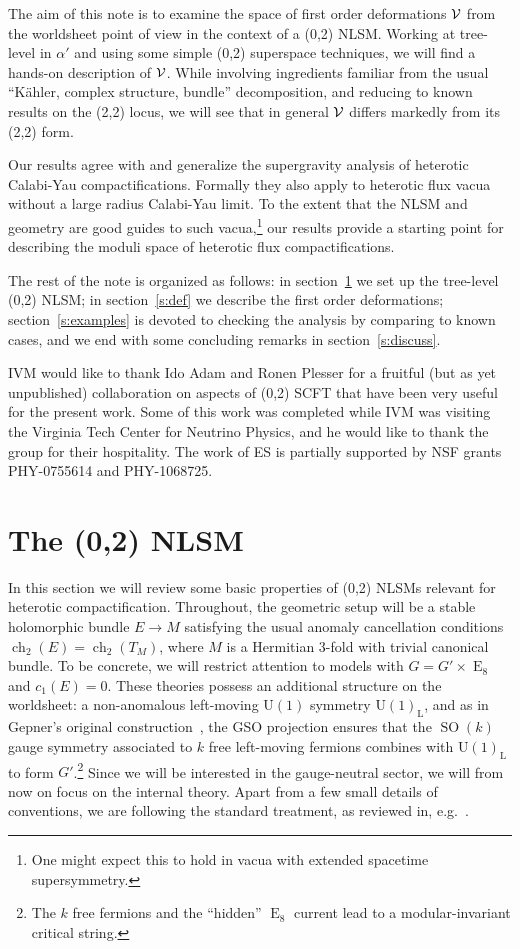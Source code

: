 \documentclass[11pt, a4paper]{article}
\def\GUL{\GU(1)_{\text{L}}}
\def\ch{\operatorname{ch}}
\def\SO{\operatorname{SO}}
\def\GU{\operatorname{U{}}}
\def\GE{\operatorname{E}}
\def\cV{{\cal V}}
\begin{document}
The aim of this note is to examine the space of first order deformations $\cV$ from the worldsheet point of view in the context of a (0,2) NLSM.  Working at tree-level in $\alpha'$ and using some simple (0,2) superspace techniques,  we will find a hands-on description of $\cV$.  While involving
ingredients familiar from the usual ``K\"ahler, complex structure, bundle'' decomposition,
and reducing to known results on the (2,2) locus, we will see that in general $\cV$ differs markedly from its (2,2) form. 

Our results agree with and generalize the supergravity analysis of heterotic Calabi-Yau compactifications.
Formally they also apply to heterotic flux vacua without a large radius Calabi-Yau limit.  To the extent that
the NLSM and geometry are good guides to such vacua,\footnote{One might expect this to hold in
vacua with extended spacetime supersymmetry.} our results provide a starting point for describing the moduli
space of heterotic flux compactifications. 

The rest of the note is organized as follows:  in section~\ref{s:nlsm} we set up the
tree-level (0,2) NLSM; in section~\ref{s:def} we describe the first order deformations;
section~\ref{s:examples} is devoted to checking the analysis by comparing to known cases,
and we end with some concluding remarks in section~\ref{s:discuss}.

\acknowledgments 
IVM would like to thank Ido Adam and Ronen Plesser for a fruitful (but as yet unpublished) 
collaboration on aspects of (0,2) SCFT that have been very useful for the present work.
Some of this work was completed while IVM was visiting the Virginia Tech Center for Neutrino
Physics, and he would like to thank the group for their hospitality.  The work of ES is partially
supported by NSF grants PHY-0755614 and PHY-1068725.



\section{The (0,2) NLSM} \label{s:nlsm}
In this section we will review some basic properties of (0,2) NLSMs relevant for
heterotic compactification.  Throughout, the geometric setup will be a stable 
holomorphic bundle $E \to M$ satisfying the usual anomaly cancellation conditions
$\ch_2(E) = \ch_2(T_M)$, where $M$ is a Hermitian $3$-fold with trivial canonical bundle.
To be concrete, we will restrict attention to models with $G = G' \times\GE_8$ and
$c_1(E) = 0$.  These theories possess an additional structure on the worldsheet:
a non-anomalous left-moving $\GU(1)$ symmetry $\GUL$, and as in Gepner's original
construction~\cite{Gepner:1987vz}, the GSO projection ensures that the $\SO(k)$ gauge symmetry associated to $k$ free left-moving fermions combines with 
$\GUL$ to form $G'$.\footnote{The $k$ free fermions and the ``hidden'' $\GE_8$ current lead to a modular-invariant critical string.}  Since we will be interested in the gauge-neutral sector, we will from now on focus on the internal theory.  Apart from a few small details
of conventions, we are following the standard treatment, as reviewed 
in, e.g.~\cite{Distler:1995mi}.
\end{document}
